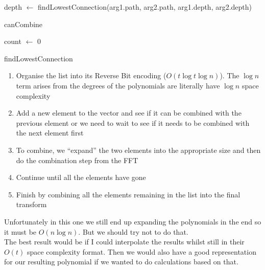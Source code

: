 \begin{algorithm}[H]
  \SetAlgoLined
  depth $\gets$ findLowestConnection(arg1.path, arg2.path, arg1.depth, arg2.depth)\;
  \;
  \caption{canCombine}
\end{algorithm}

\begin{algorithm}[H]
  \SetAlgoLined
  count $\gets$ 0\;
  \caption{findLowestConnection}
\end{algorithm}

\begin{enumerate}[1.]
  \item Organise the list into its Reverse Bit encoding ($O(t \log t \log n)$). The $\log n$ term arises from the degrees of the polynomials are literally have $\log n$ space complexity
  \item Add a new element to the vector and see if it can be combined with the previous element or we need to wait to see if it needs to be combined with the next element first
  \item To combine, we ``expand'' the two elements into the appropriate size and then do the combination step from the FFT
  \item Continue until all the elements have gone
  \item Finish by combining all the elements remaining in the list into the final transform
\end{enumerate}

Unfortunately in this one we still end up expanding the polynomials in the end so it must be $O(n\log n)$. But we should try not to do that.\\
The best result would be if I could interpolate the results whilst still in their $O(t)$ space complexity format. Then we would also have a good representation for our resulting polynomial if we wanted to do calculations based on that.

